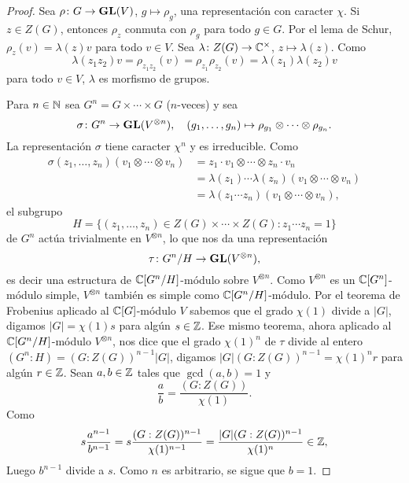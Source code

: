 \begin{proof}
    Sea $\rho\colon G\to\mathbf{GL}(V)$, $g\mapsto\rho_g$, una representación con caracter $\chi$. 
    Si $z\in Z(G)$, entonces $\rho_z$ conmuta con $\rho_g$ para todo $g\in G$. Por el lema de Schur, 
    $\rho_z(v)=\lambda(z)v$ para todo $v\in V$. Sea $\lambda\colon Z(G)\to\mathbb{C}^\times$, $z\mapsto \lambda(z)$. Como 
    \[
    \lambda(z_1z_2)v=\rho_{z_1z_2}(v)=\rho_{z_1}\rho_{z_2}(v)=\lambda(z_1)\lambda(z_2)v
    \]
    para todo $v\in V$, $\lambda$ es morfismo de grupos. 
    
    Para $n\in\mathbb{N}$ sea $G^n=G\times\cdots\times G$ ($n$-veces) y 
    sea 
    \[
    \sigma\colon G^n\to\mathbf{GL}(V^{\otimes n}),
    \quad 
    (g_1,\dots,g_n)\mapsto \rho_{g_1}\otimes\cdots\otimes\rho_{g_n}.
    \]
    La representación $\sigma$ tiene
    caracter $\chi^{n}$ y es irreducible. 
    Como 
    \begin{align*}
    \sigma(z_1,\dots,z_n)(v_1\otimes\cdots\otimes v_n)
    &=z_1\cdot v_1\otimes\cdots\otimes z_n\cdot v_n\\
    &=\lambda(z_1)\cdots\lambda(z_n)(v_1\otimes\cdots\otimes v_n)\\
    &=\lambda(z_1\cdots z_n)(v_1\otimes\cdots\otimes v_n),
    \end{align*}
    el subgrupo 
    \[
    H=\{(z_1,\dots,z_n)\in Z(G)\times\cdots\times Z(G):z_1\cdots z_n=1\}
    \]
    de $G^n$ actúa trivialmente
    en $V^{\otimes n}$, lo que nos da una representación 
    \[
    \tau\colon G^n/H\to\mathbf{GL}(V^{\otimes n}),
    \]
    es decir una
    estructura de $\mathbb{C}[G^n/H]$-módulo sobre $V^{\otimes n}$. Como $V^{\otimes n}$ 
    es un $\mathbb{C}[G^n]$-módulo simple, $V^{\otimes n}$ también es simple como $\mathbb{C}[G^n/H]$-módulo. 
    Por el teorema de Frobenius aplicado al $\mathbb{C}[G]$-módulo $V$ sabemos que 
    el grado $\chi(1)$ divide a $|G|$, digamos $|G|=\chi(1)s$ para algún $s\in\mathbb{Z}$. 
    Ese mismo teorema, ahora 
    aplicado al $\mathbb{C}[G^n/H]$-módulo $V^{\otimes n}$, nos dice que
    el grado $\chi(1)^n$ de $\tau$ 
    divide al entero $(G^n:H)=(G:Z(G))^{n-1}|G|$, digamos $|G|(G:Z(G))^{n-1}=\chi(1)^nr$ para algún $r\in\mathbb{Z}$. 
    Sean $a,b\in\mathbb{Z}$ tales que $\gcd(a,b)=1$ y 
    \[
    \frac{a}{b}=\frac{(G:Z(G))}{\chi(1)}.
    \]
    Como 
    \[
    s\frac{a^{n-1}}{b^{n-1}}=s\frac{(G:Z(G))^{n-1}}{\chi(1)^{n-1}}=\frac{|G|(G:Z(G))^{n-1}}{\chi(1)^n}\in\mathbb{Z},
    \]
    Luego $b^{n-1}$ divide a $s$. Como $n$ es arbitrario, se sigue que $b=1$. 
\end{proof}

